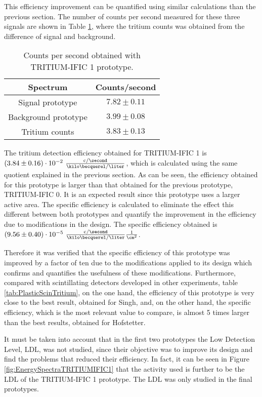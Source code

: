 This efficiency improvement can be quantified using similar calculations than the previous section. The number of counts per second measured for these three signals are shown in Table \ref{tab:CountsPerSecondTRITIUMIFIC1}, where the tritium counts was obtained from the difference of signal and background.

\begin{table}[h]
\begin{center}
\begin{tabular}{|c|c|}
\hline
Spectrum & Counts/second\\
\hline \hline \hline
Signal prototype & $7.82 \pm 0.11$ \\ \hline
Background prototype & $3.99 \pm 0.08$ \\ \hline
Tritium counts & $3.83 \pm 0.13$ \\ \hline
\end{tabular}
\caption{Counts per second obtained with TRITIUM-IFIC 1 prototype.}
\label{tab:CountsPerSecondTRITIUMIFIC1}
\end{center}
\end{table}

The tritium detection efficiency obtained for TRITIUM-IFIC 1 is $(3.84 \pm 0.16)\cdot{} 10^{-2}~ \frac{\text{c}/\second}{\kilo\becquerel/\liter}$, which is calculated using the same quotient explained in the previous section. As can be seen, the efficiency obtained for this prototype is larger than that obtained for the previous prototype, TRITIUM-IFIC 0. It is an expected result since this prototype uses a larger active area. The specific efficiency is calculated to eliminate the effect this different between both prototypes and quantify the improvement in the efficiency due to modifications in the design. The specific efficiency obtained is $(9.56 \pm 0.40)\cdot{} 10^{-5}~ \frac{\text{c}/\second}{\kilo\becquerel/\liter}\frac{1}{\cm^{2}}$.

Therefore it was verified that the specific efficiency of this prototype was improved by a factor of ten due to the modifications applied to its design which confirms and quantifies the usefulness of these modifications. Furthermore, compared with scintillating detectors developed in other experiments, table \ref{tab:PlasticScinTritium}, on the one hand, the efficiency of this prototype is very close to the best result, obtained for Singh, and, on the other hand, the specific efficiency, which is the most relevant value to compare, is almost 5 times larger than the best results, obtained for Hofstetter.

It must be taken into account that in the first two prototypes the Low Detection Level, LDL, was not studied, since their objective was to improve its design and find the problems that reduced their efficiency. In fact, it can be seen in Figure \ref{fig:EnergySpectraTRITIUMIFIC1} that the activity used is further to be the LDL of the TRITIUM-IFIC 1 prototype. The LDL was only studied in the final prototypes.